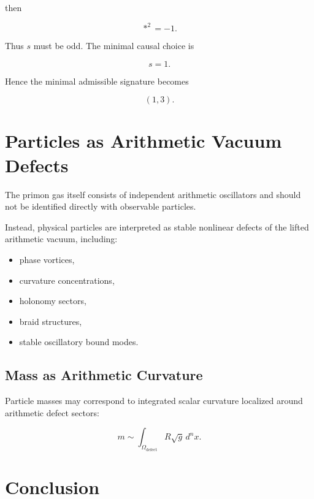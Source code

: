 \documentclass[11pt]{article}
\begin{document}
then

\begin{equation}
*^2=-1.
\end{equation}

Thus $s$ must be odd. The minimal causal choice is

\begin{equation}
s=1.
\end{equation}

Hence the minimal admissible signature becomes

\begin{equation}
(1,3).
\end{equation}

\section{Particles as Arithmetic Vacuum Defects}

The primon gas itself consists of independent arithmetic oscillators and should not be identified directly with observable particles.

Instead, physical particles are interpreted as stable nonlinear defects of the lifted arithmetic vacuum, including:

\begin{itemize}[leftmargin=1.5cm]
\item phase vortices,
\item curvature concentrations,
\item holonomy sectors,
\item braid structures,
\item stable oscillatory bound modes.
\end{itemize}

\subsection{Mass as Arithmetic Curvature}

Particle masses may correspond to integrated scalar curvature localized around arithmetic defect sectors:

\begin{equation}
m
\sim
\int_{\Omega_{\text{defect}}}
R \sqrt{g}\, d^n x.
\end{equation}

\section{Conclusion}
\end{document}
